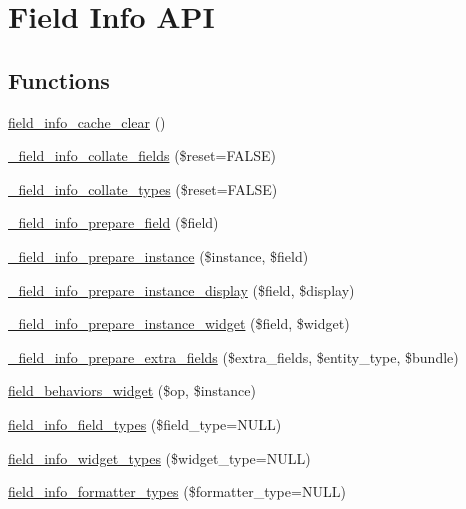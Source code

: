 \hypertarget{group__field__info}{
\section{Field Info API}
\label{group__field__info}
}
\subsection*{Functions}
\begin{DoxyCompactItemize}
\item 
\hyperlink{group__field__info_ga40cf38b714f91269818e2e65c860c794}{field\_\-info\_\-cache\_\-clear} ()
\item 
\hyperlink{group__field__info_gaf30341049660e58d46d0e132b88808b1}{\_\-field\_\-info\_\-collate\_\-fields} (\$reset=FALSE)
\item 
\hyperlink{group__field__info_gaa67e86dc65fe20e4669170ee665cfae4}{\_\-field\_\-info\_\-collate\_\-types} (\$reset=FALSE)
\item 
\hyperlink{group__field__info_ga05abfb7bf7b8a44e2a74bba47f15004f}{\_\-field\_\-info\_\-prepare\_\-field} (\$field)
\item 
\hyperlink{group__field__info_ga8518b847132ddca82db418e588cdb88a}{\_\-field\_\-info\_\-prepare\_\-instance} (\$instance, \$field)
\item 
\hyperlink{group__field__info_ga046dc640188fb6a51b904ce74e3194d0}{\_\-field\_\-info\_\-prepare\_\-instance\_\-display} (\$field, \$display)
\item 
\hyperlink{group__field__info_gab26a944e3e07f9a9e4c65ab46b89e2f3}{\_\-field\_\-info\_\-prepare\_\-instance\_\-widget} (\$field, \$widget)
\item 
\hyperlink{group__field__info_ga27575a75b302b0b030e021346c71e857}{\_\-field\_\-info\_\-prepare\_\-extra\_\-fields} (\$extra\_\-fields, \$entity\_\-type, \$bundle)
\item 
\hyperlink{group__field__info_ga5a67471e2842a7ab75ed3d03f645cf5a}{field\_\-behaviors\_\-widget} (\$op, \$instance)
\item 
\hyperlink{group__field__info_ga7f5100daee334d9f76952cb49d7d3613}{field\_\-info\_\-field\_\-types} (\$field\_\-type=NULL)
\item 
\hyperlink{group__field__info_gac0e6e70677c9e7901a2064f5bfb1dce8}{field\_\-info\_\-widget\_\-types} (\$widget\_\-type=NULL)
\item 
\hyperlink{group__field__info_ga15d0c58339302add261016e73365c526}{field\_\-info\_\-formatter\_\-types} (\$formatter\_\-type=NULL)

\end{DoxyCompactItemize}
